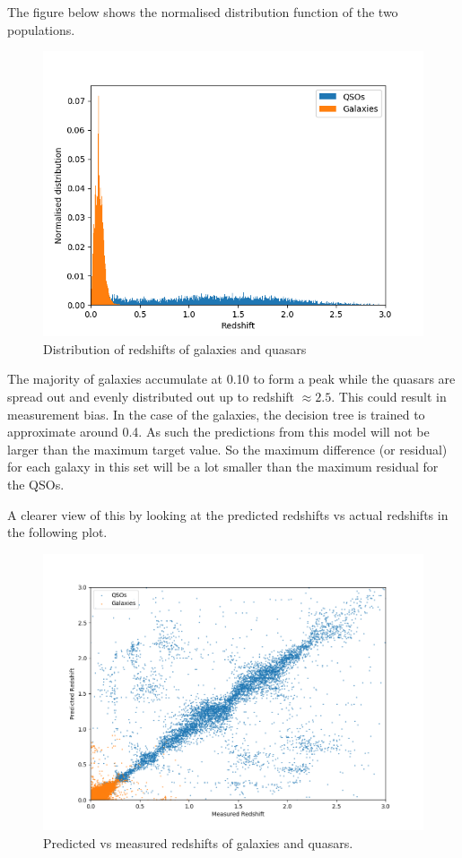 The figure below shows the normalised distribution function of the two populations.
\begin{figure}[H]
	\centering
	\includegraphics[width=\linewidth,keepaspectratio]{images/misc/redshift_distribution.png}
	\caption{Distribution of redshifts of galaxies and quasars}
	\label{fig:qrg}
\end{figure}
The majority of galaxies accumulate at 0.10 to form a peak while the quasars are spread out and evenly distributed out up to redshift $\approx 2.5$. This could result in measurement bias. In the case of the galaxies, the decision tree is trained to approximate around 0.4. As such the predictions from this model will not be larger than the maximum target value. So the maximum difference (or residual) for each galaxy in this set will be a lot smaller than the maximum residual for the QSOs.

A clearer view of this by looking at the predicted redshifts vs actual redshifts in the following plot.
\begin{figure}[H]
	\centering
	\includegraphics[width=\linewidth,keepaspectratio]{images/misc/predicted_actual_qso.png}
	\caption{Predicted vs measured redshifts of galaxies and quasars.}
	\label{fig:prq}
\end{figure}

